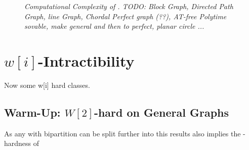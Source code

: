 \begin{figure}
    \centering
    \resizebox{1.0\textwidth}{!}{
        
    }
    \caption{\textit{Computational Complexity of \sdom. TODO: Block Graph, Directed Path Graph, line Graph, Chordal Perfect graph (??), AT-free Polytime sovable, make general and then to perfect, planar circle ...}}
    \label{fig:kernelization}
\end{figure}


\section{\hmath $w[i]$-Intractibility}

Now some w[i] hard classes. 

\subsection{Warm-Up: \hmath $W[2]$-hard on General Graphs}


As any \bg with bipartition can be split further into \rpg this results also implies the \wone-hardness of \rpg

